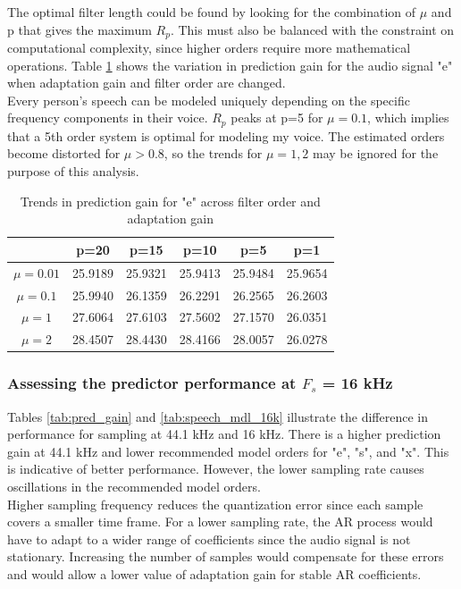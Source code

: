 \documentclass{article}
\begin{document}
The optimal filter length could be found by looking for the combination of $\mu$ and p that gives the maximum $R_p$. This must also be balanced with the constraint on computational complexity, since higher orders require more mathematical operations. Table \ref{tab:filter_len} shows the variation in prediction gain for the audio signal "e" when adaptation gain and filter order are changed.\\

Every person's speech can be modeled uniquely depending on the specific frequency components in their voice. $R_p$ peaks at p=5 for $\mu=0.1$, which implies that a 5th order system is optimal for modeling my voice. The estimated orders become distorted for $\mu>0.8$, so the trends for $\mu=1,2$ may be ignored for the purpose of this analysis.

\begin{table}[h!]
\centering
\begin{tabular}{|c|c|c|c|c|c|}
\hline
           & p=20  & p=15  & p=10  & p=5   & p=1   \\ \hline
$\mu=0.01$ & 25.9189 & 25.9321 & 25.9413 & 25.9484 & 25.9654 \\ \hline
$\mu=0.1$  & 25.9940 & 26.1359 & 26.2291 & 26.2565 & 26.2603 \\ \hline
$\mu=1$    & 27.6064 & 27.6103 & 27.5602 & 27.1570 & 26.0351 \\ \hline
$\mu=2$    & 28.4507 & 28.4430 & 28.4166 & 28.0057 & 26.0278 \\ \hline
\end{tabular}
\caption{Trends in prediction gain for "e" across filter order and adaptation gain}
\label{tab:filter_len}
\end{table}


\pagebreak


\subsubsection{Assessing the predictor performance at $F_s$ = 16 kHz}

Tables \ref{tab:pred_gain} and \ref{tab:speech_mdl_16k} illustrate the difference in performance for sampling at 44.1 kHz and 16 kHz. There is a higher prediction gain at 44.1 kHz and lower recommended model orders for "e", "s", and "x". This is indicative of better performance. However, the lower sampling rate causes oscillations in the recommended model orders.\\ 

Higher sampling frequency reduces the quantization error since each sample covers a smaller time frame. For a lower sampling rate, the AR process would have to adapt to a wider range of coefficients since the audio signal is not stationary. Increasing the number of samples would compensate for these errors and would allow a lower value of adaptation gain for stable AR coefficients.
\end{document}
